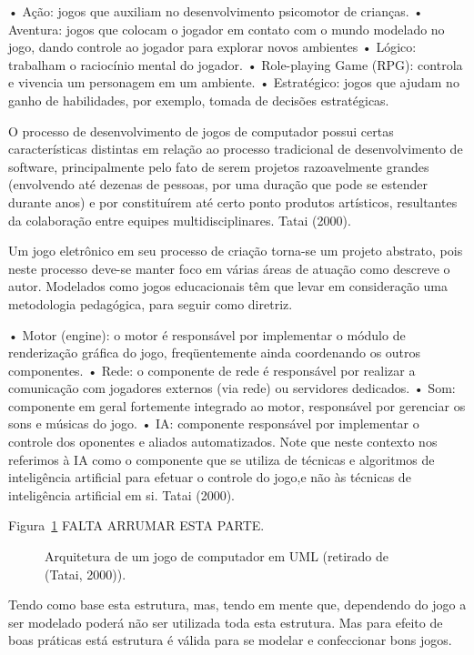 • Ação: jogos que auxiliam no desenvolvimento psicomotor de crianças.
• Aventura: jogos que colocam o jogador em contato com o mundo modelado no jogo, dando controle ao jogador para explorar novos ambientes
• Lógico: trabalham o raciocínio mental do jogador.
• Role-playing Game (RPG): controla e vivencia um personagem em um ambiente. 
• Estratégico: jogos que ajudam no ganho de habilidades, por exemplo, tomada de decisões estratégicas. 

\begin{citacao}
O processo de desenvolvimento de jogos de computador possui certas características distintas em relação ao processo tradicional de desenvolvimento de software, principalmente pelo fato de serem projetos razoavelmente grandes (envolvendo até dezenas de pessoas, por uma duração que pode se estender durante anos) e por constituírem até certo ponto produtos artísticos, resultantes da colaboração entre equipes multidisciplinares. Tatai (2000).
\end{citacao}

Um jogo eletrônico em seu processo de criação torna-se um projeto abstrato, pois neste processo deve-se manter foco em várias áreas de atuação como descreve o autor. Modelados como jogos educacionais têm que levar em consideração uma metodologia pedagógica, para seguir como diretriz.

• Motor (engine): o motor é responsável por implementar o módulo de renderização gráfica do jogo, freqüentemente ainda coordenando os outros componentes.
• Rede: o componente de rede é responsável por realizar a comunicação com jogadores externos (via rede) ou servidores dedicados.
• Som: componente em geral fortemente integrado ao motor, responsável por gerenciar os sons e músicas do jogo.
• IA: componente responsável por implementar o controle dos oponentes e aliados automatizados. Note que neste contexto nos referimos à IA como o componente que se utiliza de técnicas e algoritmos de inteligência artificial para efetuar o controle do jogo,e não às técnicas de inteligência artificial em si. Tatai (2000).

Figura~\ref{f1.6} FALTA ARRUMAR ESTA PARTE.
\begin{figure}[!hbp]
\makebox[\textwidth]{\framebox[5cm]{\rule{0pt}{5cm}}}
\caption{Arquitetura de um jogo de computador em UML (retirado de (Tatai, 2000)).} \label{f1.6}
\end{figure}

Tendo como base esta estrutura, mas, tendo em mente que, dependendo do jogo a ser modelado poderá não ser utilizada toda esta estrutura. Mas para efeito de boas práticas está estrutura é válida para se modelar e confeccionar bons jogos.

